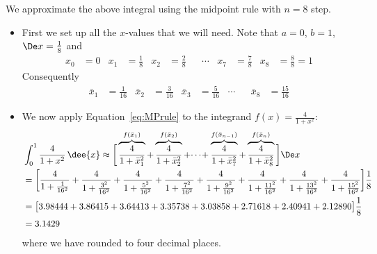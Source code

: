 \begin{eg}\label{eg:MidpointB}
We approximate the above integral using the midpoint rule with $n=8$ step.

\soln
\begin{itemize}
 \item First we set up all the $x$-values that we will need. Note that
$a=0$, $b=1$, $\De x=\tfrac{1}{8}$ and
\begin{align*}
x_0&=0 & x_1&=\tfrac{1}{8} & x_2&=\tfrac{2}{8}
&& \cdots &
x_7&=\tfrac{7}{8}&
x_8&=\tfrac{8}{8}=1
\end{align*}
Consequently
\begin{align*}
\bar x_1&= \tfrac{1}{16} &
\bar x_2&= \tfrac{3}{16} &
\bar x_3&= \tfrac{5}{16} &
\cdots&&
\bar x_8 &= \tfrac{15}{16}
\end{align*}
\item We now apply Equation~\eqref{eq:MPrule} to the integrand $f(x)=\frac{4}{1+x^2}$:
\begin{align*}
&\int_0^1 \frac{4}{1+x^2}\,\dee{x} \approx
\bigg[\overbrace{\frac{4}{1+\bar x_1^2}}^{f(\bar x_1)}
            +\overbrace{\frac{4}{1+\bar x_2^2}}^{f(\bar x_2)}
            +\!\cdots\!
           +\overbrace{\frac{4}{1+\bar x_7^2}}^{f(\bar x_{n-1})}
           +\overbrace{\frac{4}{1+\bar x_8^2}}^{f(\bar x_n)}
             \bigg]\De x \\
&=\bigg[\frac{4}{1+\tfrac{1}{16^2}}+
             \frac{4}{1+\tfrac{3^2}{16^2}}+
             \frac{4}{1+\tfrac{5^2}{16^2}}+
             \frac{4}{1+\tfrac{7^2}{16^2}}%
              +\frac{4}{1+\tfrac{9^2}{16^2}}+
             \frac{4}{1+\tfrac{11^2}{16^2}}+
             \frac{4}{1+\tfrac{13^2}{16^2}}+
             \frac{4}{1+\tfrac{15^2}{16^2}}\bigg]\frac{1}{8}\\
&=\big[      3.98444 +
             3.86415 +
             3.64413 +
             3.35738 +
             3.03858 +
             2.71618 +
             2.40941 +
             2.12890 \big]\frac{1}{8}\\
&=  3.1429
\end{align*}
where we have rounded to four decimal places.


\end{itemize}
\end{eg}

